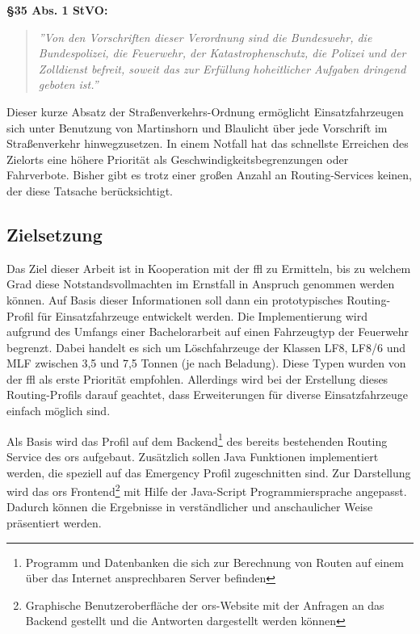 \documentclass[12pt,a4paper]{article}
\begin{document}
\textbf{§35 Abs. 1 StVO:}
\begin{quotation}
\label{cit:STVO}
{\itshape\rmfamily ''Von den Vorschriften dieser Verordnung sind die Bundeswehr, die Bundespolizei, die Feuerwehr, der Katastrophenschutz, die Polizei und der Zolldienst befreit, soweit das zur Erfüllung hoheitlicher Aufgaben dringend geboten ist.''}
\end{quotation}

\vspace{1.2cm}

Dieser kurze Absatz der Straßenverkehrs-Ordnung ermöglicht Einsatzfahrzeugen sich unter Benutzung von Martinshorn und Blaulicht über jede Vorschrift im Straßenverkehr hinwegzusetzen. In einem Notfall hat das schnellste Erreichen des Zielorts eine höhere Priorität als Geschwindigkeitsbegrenzungen oder Fahrverbote. Bisher gibt es trotz einer großen Anzahl an Routing-Services keinen, der diese Tatsache berücksichtigt. 


\subsection{Zielsetzung}
Das Ziel dieser Arbeit ist in Kooperation mit der \gls{ffl} zu Ermitteln, bis zu welchem Grad diese Notstandsvollmachten im Ernstfall in Anspruch genommen werden können. Auf Basis dieser Informationen soll dann ein prototypisches Routing-Profil für Einsatzfahrzeuge entwickelt werden. Die Implementierung wird aufgrund des Umfangs einer Bachelorarbeit auf einen Fahrzeugtyp der Feuerwehr begrenzt. Dabei handelt es sich um Löschfahrzeuge der Klassen LF8, LF8/6 und MLF zwischen 3,5 und 7,5 Tonnen (je nach Beladung). Diese Typen wurden von der \gls{ffl} als erste Priorität empfohlen. Allerdings wird bei der Erstellung dieses Routing-Profils darauf geachtet, dass Erweiterungen für diverse Einsatzfahrzeuge einfach möglich sind.
\vspace{0.5cm}

Als Basis wird das Profil auf dem Backend\footnote{Programm und Datenbanken die sich zur Berechnung von Routen auf einem über das Internet ansprechbaren Server befinden} des bereits bestehenden Routing Service des \gls{ors} aufgebaut. Zusätzlich sollen Java Funktionen implementiert werden, die speziell auf das Emergency Profil zugeschnitten sind. Zur Darstellung wird das \gls{ors} Frontend\footnote{Graphische Benutzeroberfläche der \gls{ors}-Website mit der Anfragen an das Backend gestellt und die Antworten dargestellt werden können} mit Hilfe der Java-Script Programmiersprache angepasst. Dadurch können die Ergebnisse in verständlicher und anschaulicher Weise präsentiert werden.
\end{document}
